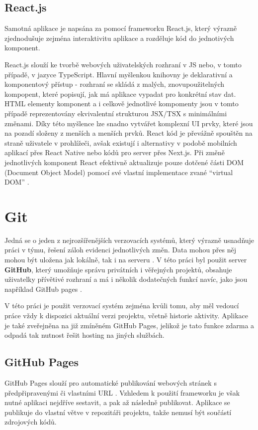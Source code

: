 \subsection{React.js}
Samotná aplikace je napsána za pomocí frameworku React.js, který výrazně zjednodušuje zejména interaktivitu aplikace a rozděluje kód do jednotivých komponent. 

React.js slouží ke tvorbě webových uživatelských rozhraní v JS nebo, v tomto případě, v jazyce TypeScript.
Hlavní myšlenkou knihovny je deklarativní a komponentový přístup - rozhraní se skládá z malých, znovupoužitelných kompopent, 
které popisují, jak má aplikace vypadat pro konkrétní stav dat. 
HTML elementy komponent a i celkově jednotlivé kompomenty jsou v tomto případě reprezentovány ekvivalentní strukturou JSX/TSX s minimálními změnami.
Díky této myšlence lze snadno vytvářet komplexní UI prvky, které jsou na pozadí složeny z menších a menších prvků.
React kód je převážně spouštěn na straně uživatele v prohlížeči, 
avšak existují i alternativy v podobě mobilních aplikací přes React Native nebo kódů pro server přes Next.js.
Při změně jednotlivých komponent React efektivně aktualizuje pouze dotčené části DOM (Document Object Model) 
pomocí své vlastní implementace zvané \enquote{virtual DOM} \cite{mozilla_react}.

\section{Git}
Jedná se o jeden z nejrozšířenějších verzovacích systémů, který výrazně usnadňuje práci v týmu, řešení záloh evidenci jednotlivých změn.
Data mohou přes něj mohou být uložena jak lokálně, tak i na serveru \cite{git}.
V této práci byl použit server \textbf{GitHub}, který umožňuje správu privátních i věřejných projektů, 
obsahuje uživatelky přívětivé rozhraní a má i několik dodatečných funkcí navíc, jako jsou například GitHub pages \cite{github}.

V této práci je použit verzovací systém zejména kvůli tomu, aby měl vedoucí práce vždy k dispozici aktuální verzi projektu, včetně historie aktivity. 
Aplikace je také zveřejněna na již zmíněném GitHub Pages, jelikož je tato funkce zdarma a odpadá tak nutnost řešit hosting na jiných službách.

\subsection{GitHub Pages}
GitHub Pages slouží pro automatické publikování webových stránek s předpřipravenými či vlastními URL \cite{githubpages}. 
Vzhledem k použití frameworku je však nutné aplikaci nejdříve sestavit, a pak až následně publikovat. 
Aplikace se publikuje do vlastní větve v repozitáři projektu, takže nemusí být součástí zdrojových kódů.
